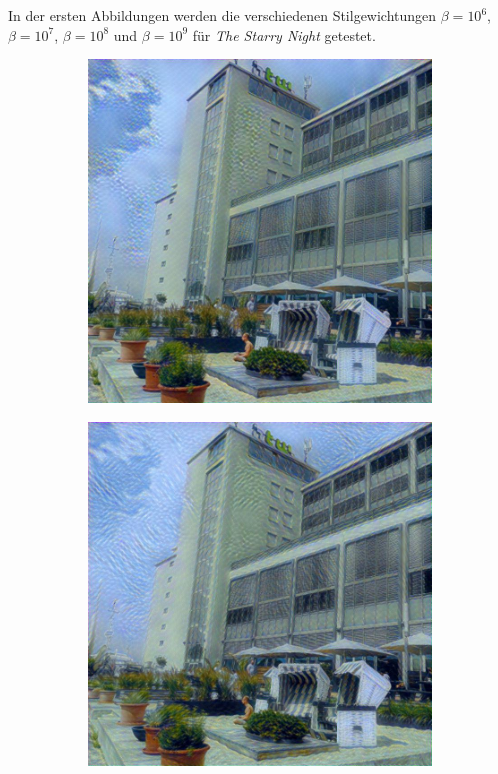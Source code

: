 In der ersten Abbildungen werden die verschiedenen
Stilgewichtungen $ \beta = 10^{6} $, $ \beta = 10^{7} $, $ \beta = 10^{8} $ und $ \beta = 10^{9} $ für \textit{The Starry Night} getestet.

\begin{figure}[H]
    \centering
    \begin{subfigure}[h]{0.24\textwidth}
        \centering
        \includegraphics[width=\textwidth]{resources/content/experiments/a__the_starry_night__768x768__style-weight_1e+06__tv-weight_0e+00.jpg}
    \end{subfigure}
    \begin{subfigure}[h]{0.24\textwidth}
        \centering
        \includegraphics[width=\textwidth]{resources/content/experiments/a__the_starry_night__768x768__style-weight_1e+07__tv-weight_0e+00.jpg}

\end{subfigure}
\end{figure}
